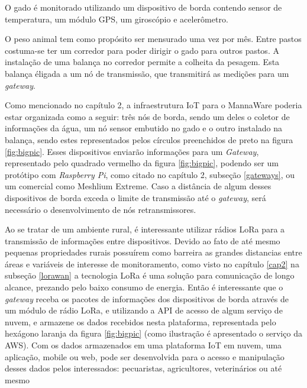 \documentclass[
    hidelinks,
	12pt,				%
	openany,
	oneside, 
	a4paper,			%
	english,			%
	french,				%
	spanish,			%
	brazil				%
	]{abntex2}
\begin{document}
O gado é monitorado utilizando um dispositivo de borda contendo sensor de temperatura, um módulo GPS, um giroscópio e acelerômetro.

O peso animal tem como propósito ser mensurado uma vez por mês. Entre pastos costuma-se ter um corredor para poder dirigir o gado para outros pastos. A instalação de uma balança no corredor permite a colheita da pesagem. Esta balança éligada a um nó de transmissão, que transmitirá as medições para um \textit{gateway}.

Como mencionado no capítulo 2, a infraestrutura IoT  para o MannaWare poderia estar organizada como a seguir: três nós de borda, sendo um deles o coletor de informações da água, um nó sensor embutido no gado e o outro instalado na balança, sendo estes representados pelos círculos preenchidos de preto na figura \ref{fig:bigpic}. Esses dispositivos enviarão informações para um \textit{Gateway}, representado pelo quadrado vermelho da figura \ref{fig:bigpic}, podendo ser um protótipo com \textit{Raspberry Pi}, como citado no capítulo 2, subseção \ref{gateways}, ou um comercial como Meshlium Extreme. Caso a distância de algum desses dispositivos de borda exceda o limite de transmissão até o \textit{gateway}, será necessário o desenvolvimento de nós retransmissores.

Ao se tratar de um ambiente rural, é interessante utilizar rádios LoRa para a transmissão de informações entre dispositivos. Devido ao fato de até mesmo pequenas propriedades rurais possuírem como barreira as grandes distancias entre áreas e variáveis de interesse de monitoramento, como visto no capítulo \ref{cap2} na subseção \ref{lorawan} a tecnologia LoRa é uma solução para comunicação de longo alcance, prezando pelo baixo consumo de energia. Então é interessante que o  \textit{gateway} receba os pacotes de informações dos dispositivos de borda através de um módulo de rádio LoRa, e utilizando a API de acesso de algum serviço de nuvem, e armazene os dados recebidos nesta plataforma, representada pelo hexágono laranja da figura \ref{fig:bigpic} (como ilustração é apresentado o serviço da AWS). Com os dados armazenados em uma plataforma IoT em nuvem, uma aplicação, mobile ou web, pode ser desenvolvida para o acesso e manipulação desses dados pelos interessados: pecuaristas, agricultores, veterinários ou até mesmo 

\end{document}
